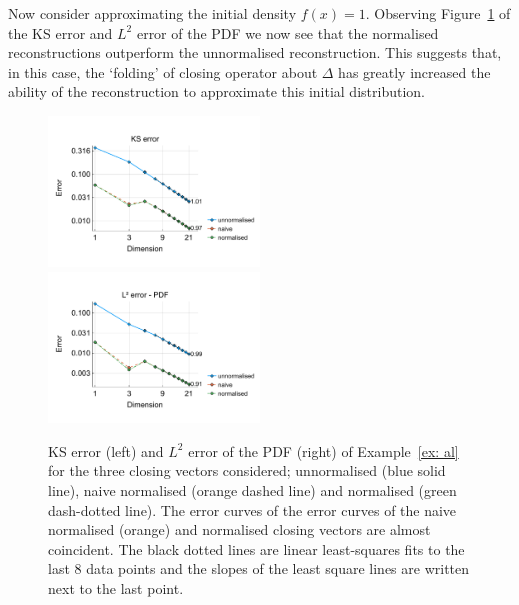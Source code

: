 \begin{example}\label{ex: al}
	Now consider approximating the initial density \(f(x)=1\). Observing Figure~\ref{fig: fun 4 ks error qbdrap closing vecs} of the KS error and \(L^2\) error of the PDF we now see that the normalised reconstructions outperform the unnormalised reconstruction. This suggests that, in this case, the `folding' of closing operator about \(\Delta\) has greatly increased the ability of the reconstruction to approximate this initial distribution. 
\begin{figure}[h]
	\centering
	\includegraphics[width=0.5\textwidth,trim={0.5cm 0.8cm 0.2cm 1.25cm},clip]{chapter6/figs/qbdrap_closing_vec/fun4/ks_error_formatted.pdf}%
	\includegraphics[width=0.5\textwidth,trim={0.5cm 0.8cm 0.2cm 1.25cm},clip]{chapter6/figs/qbdrap_closing_vec/fun4/l2_pdf_error_formatted.pdf}
	\caption{KS error (left) and \(L^2\) error of the PDF (right) of Example~\ref{ex: al} for the three closing vectors considered; unnormalised (blue solid line), naive normalised (orange dashed line) and normalised (green dash-dotted line). The error curves of the error curves of the naive normalised (orange) and normalised closing vectors are almost coincident. The black dotted lines are linear least-squares fits to the last 8 data points and the slopes of the least square lines are written next to the last point.}
	\label{fig: fun 4 ks error qbdrap closing vecs}
\end{figure}


\end{example}
